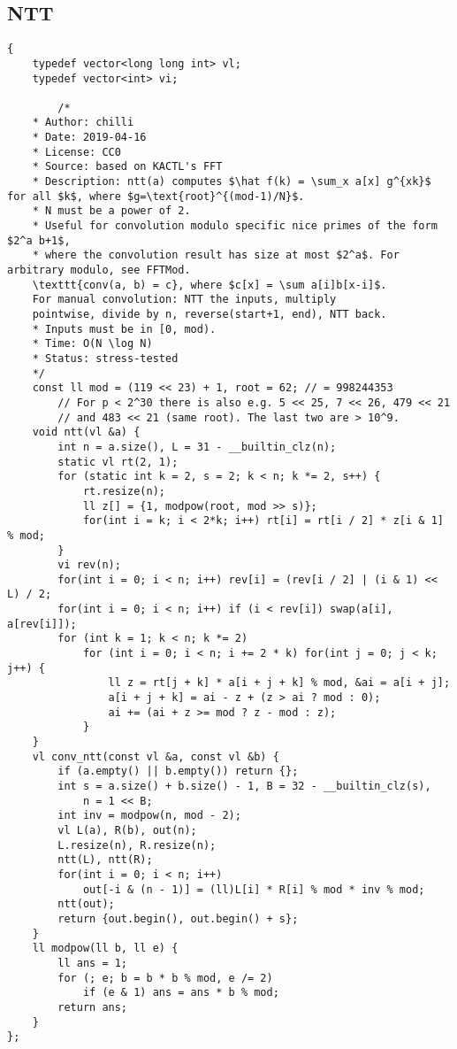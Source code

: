 \documentclass[11pt, a4paper, twoside]{article}
\begin{document}
\subsection{NTT}
\begin{verbatim}
{
    typedef vector<long long int> vl;
    typedef vector<int> vi;
    
        /*
    * Author: chilli
    * Date: 2019-04-16
    * License: CC0
    * Source: based on KACTL's FFT
    * Description: ntt(a) computes $\hat f(k) = \sum_x a[x] g^{xk}$ for all $k$, where $g=\text{root}^{(mod-1)/N}$.
    * N must be a power of 2.
    * Useful for convolution modulo specific nice primes of the form $2^a b+1$,
    * where the convolution result has size at most $2^a$. For arbitrary modulo, see FFTMod.
    \texttt{conv(a, b) = c}, where $c[x] = \sum a[i]b[x-i]$.
    For manual convolution: NTT the inputs, multiply
    pointwise, divide by n, reverse(start+1, end), NTT back.
    * Inputs must be in [0, mod).
    * Time: O(N \log N)
    * Status: stress-tested
    */
    const ll mod = (119 << 23) + 1, root = 62; // = 998244353
        // For p < 2^30 there is also e.g. 5 << 25, 7 << 26, 479 << 21
        // and 483 << 21 (same root). The last two are > 10^9.
    void ntt(vl &a) {
        int n = a.size(), L = 31 - __builtin_clz(n);
        static vl rt(2, 1);
        for (static int k = 2, s = 2; k < n; k *= 2, s++) {
            rt.resize(n);
            ll z[] = {1, modpow(root, mod >> s)};
            for(int i = k; i < 2*k; i++) rt[i] = rt[i / 2] * z[i & 1] % mod;
        }
        vi rev(n);
        for(int i = 0; i < n; i++) rev[i] = (rev[i / 2] | (i & 1) << L) / 2;
        for(int i = 0; i < n; i++) if (i < rev[i]) swap(a[i], a[rev[i]]);
        for (int k = 1; k < n; k *= 2)
            for (int i = 0; i < n; i += 2 * k) for(int j = 0; j < k; j++) {
                ll z = rt[j + k] * a[i + j + k] % mod, &ai = a[i + j];
                a[i + j + k] = ai - z + (z > ai ? mod : 0);
                ai += (ai + z >= mod ? z - mod : z);
            }
    }
    vl conv_ntt(const vl &a, const vl &b) {
        if (a.empty() || b.empty()) return {};
        int s = a.size() + b.size() - 1, B = 32 - __builtin_clz(s),
            n = 1 << B;
        int inv = modpow(n, mod - 2);
        vl L(a), R(b), out(n);
        L.resize(n), R.resize(n);
        ntt(L), ntt(R);
        for(int i = 0; i < n; i++)
            out[-i & (n - 1)] = (ll)L[i] * R[i] % mod * inv % mod;
        ntt(out);
        return {out.begin(), out.begin() + s};
    }
    ll modpow(ll b, ll e) {
        ll ans = 1;
        for (; e; b = b * b % mod, e /= 2)
            if (e & 1) ans = ans * b % mod;
        return ans;
    }
};
\end{verbatim}
\end{document}
